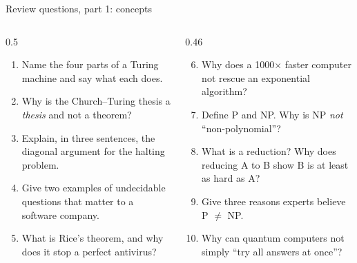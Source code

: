 \begin{frame}{Review questions, part 1: concepts}
\begin{columns}[T]
\begin{column}{0.5\textwidth}
\small
\begin{enumerate}\setlength\itemsep{2.5mm}
\item Name the four parts of a Turing machine and say what each does.
\item Why is the Church--Turing thesis a \emph{thesis} and not a theorem?
\item Explain, in three sentences, the diagonal argument for the halting problem.
\item Give two examples of undecidable questions that matter to a software company.
\item What is Rice's theorem, and why does it stop a perfect antivirus?
\end{enumerate}
\end{column}
\begin{column}{0.46\textwidth}
\small
\begin{enumerate}\setcounter{enumi}{5}\setlength\itemsep{2.5mm}
\item Why does a 1000$\times$ faster computer not rescue an exponential algorithm?
\item Define P and NP. Why is NP \emph{not} ``non-polynomial''?
\item What is a reduction? Why does reducing A to B show B is at least as hard as A?
\item Give three reasons experts believe P $\neq$ NP.
\item Why can quantum computers not simply ``try all answers at once''?
\end{enumerate}
\end{column}
\end{columns}
\end{frame}

